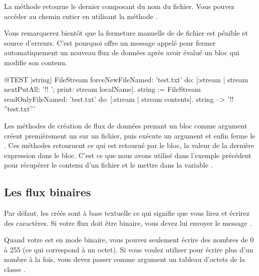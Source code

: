 \documentclass[a4paper,10pt,twoside]{book}
\begin{document}


La m\'ethode  retourne le dernier composant du nom du fichier. Vous pouvez acc\'eder au chemin entier en utilisant la m\'ethode
.

Vous remarquerez bient\^ot que la fermeture manuelle de \stream de fichier
est p\'enible et source d'erreurs. C'est pourquoi 
offre un message appel\'e  
pour fermer automatiquement un nouveau flux de donn\'ees apr\`es
avoir \'evalu\'e un bloc qui modifie son contenu.

\begin{code}{@TEST |string|}
FileStream
    forceNewFileNamed: 'test.txt'
    do: [:stream |
        stream
            nextPutAll: '!! ';
            print: stream localName].
string := FileStream
            readOnlyFileNamed: 'test.txt'
            do: [:stream | stream contents].
string --> '!! ''test.txt'''
\end{code}

Les m\'ethodes de cr\'eation de flux de donn\'ees prenant un bloc comme
argument cr\'eent premi\`erement un \stream sur un fichier, puis ex\'ecute
un argument et enfin ferme le \stream. Ces m\'ethodes retournent ce qui est retourn\'e par le bloc, \ie la valeur de la derni\`ere
expression dans le bloc. C'est ce que nous avons utilis\'e dans
l'exemple pr\'ec\'edent pour r\'ecup\'erer le contenu d'un fichier
et le mettre dans la variable .

\subsection{Les flux binaires}
\label{sec:binary-streams}

Par d\'efaut, les \streams cr\'e\'es sont \`a base textuelle ce qui signifie
que vous lirez et \'ecrirez des caract\`eres.
Si votre flux doit \^etre binaire, vous devez lui envoyer le message 
.

Quand votre \stream est en mode binaire, vous pouvez seulement \'ecrire
des nombres de 0 \`a 255 (ce qui correspond \`a un octet). Si
vous voulez utiliser  pour \'ecrire plus d'un
nombre \`a la fois, vous devez passer comme
argument un tableau d'octets de la classe .
\end{document}
